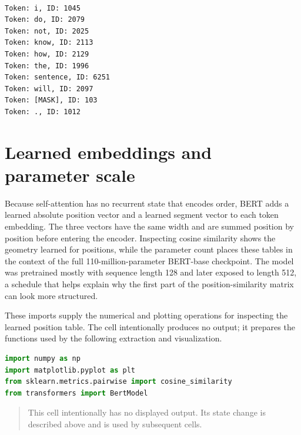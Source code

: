 \documentclass[../labs.tex]{subfiles}
\begin{document}
\begin{lstlisting}[style=terminalOutput,breakatwhitespace=false,columns=fullflexible]

Token: i, ID: 1045
Token: do, ID: 2079
Token: not, ID: 2025
Token: know, ID: 2113
Token: how, ID: 2129
Token: the, ID: 1996
Token: sentence, ID: 6251
Token: will, ID: 2097
Token: [MASK], ID: 103
Token: ., ID: 1012

\end{lstlisting}

\section{Learned embeddings and parameter scale}

Because self-attention has no recurrent state that encodes order, BERT adds a learned absolute position vector and a learned segment vector to each token embedding. The three vectors have the same width and are summed position by position before entering the encoder. Inspecting cosine similarity shows the geometry learned for positions, while the parameter count places these tables in the context of the full 110-million-parameter BERT-base checkpoint. The model was pretrained mostly with sequence length 128 and later exposed to length 512, a schedule that helps explain why the first part of the position-similarity matrix can look more structured.



These imports supply the numerical and plotting operations for inspecting the learned position table. The cell intentionally produces no output; it prepares the functions used by the following extraction and visualization.


\begin{lstlisting}[language=Python,basicstyle=\ttfamily\scriptsize,breaklines=true,breakatwhitespace=false,columns=fullflexible,keepspaces=true,numbers=none]
import numpy as np
import matplotlib.pyplot as plt
from sklearn.metrics.pairwise import cosine_similarity
from transformers import BertModel
\end{lstlisting}

\hypertarget{out:lab03-bert-c10}{}\label{out:lab03-bert-c10}

\begin{quote}\small This cell intentionally has no displayed output. Its state change is described above and is used by subsequent cells.\end{quote}
\end{document}
